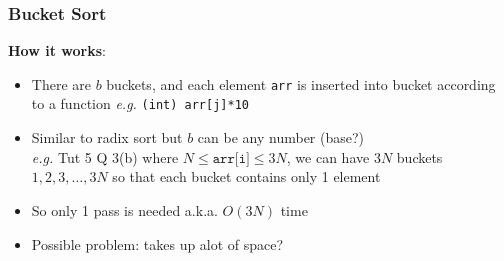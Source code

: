 \documentclass{article}
\newcommand{\eg}[0]{\textit{e.g. }}
\begin{document}
\begin{multicols}{2}
\subsubsection{Bucket Sort}
\textbf{How it works}:
\begin{itemize}
	\item There are $b$ buckets, and each element \texttt{arr} is inserted into bucket according to a function \eg \texttt{(int) arr[j]*10}
	\item Similar to radix sort but $b$ can be any number (base?)\\
	\eg Tut 5 Q 3(b) where $N \leq \texttt{arr[i]} \leq 3N$,  we can have $3N$ buckets $1,2,3, \dots, 3N$ so that each bucket contains only 1 element
	\item So only 1 pass is needed a.k.a. $O(3N)$ time
	\item Possible problem: takes up alot of space?
\end{itemize}
\begin{table}[H]
\end{table}


\end{multicols}
\end{document}
